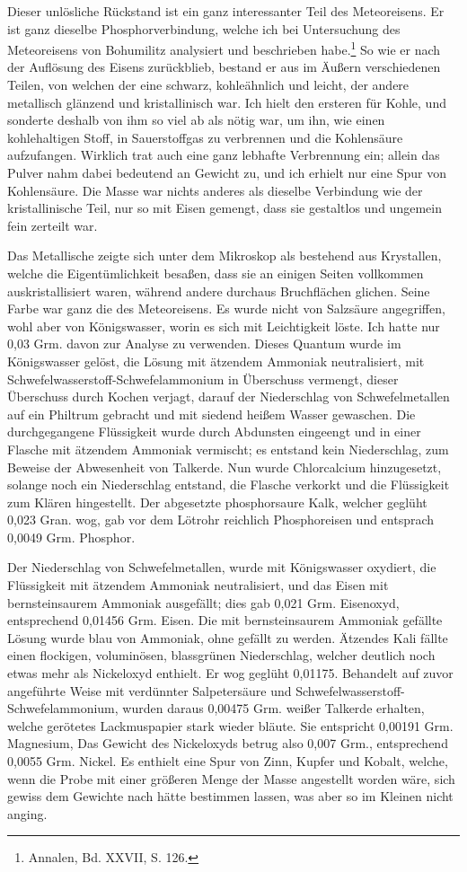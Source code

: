 \documentclass[a4paper, 11pt, oneside]{article}
\begin{document}
Dieser unlösliche Rückstand ist ein ganz interessanter Teil des Meteoreisens. Er ist ganz dieselbe Phosphorverbindung, welche ich bei Untersuchung des Meteoreisens von Bohumilitz analysiert und beschrieben habe.\footnote{Annalen, Bd. XXVII, S. 126.} So wie er nach der Auflösung des Eisens zurückblieb, bestand er aus im Äußern verschiedenen Teilen, von welchen der eine schwarz, kohleähnlich und leicht, der andere metallisch glänzend und kristallinisch war. Ich hielt den ersteren für Kohle, und sonderte deshalb von ihm so viel ab als nötig war, um ihn, wie einen kohlehaltigen Stoff, in Sauerstoffgas zu verbrennen und die Kohlensäure aufzufangen. Wirklich trat auch eine ganz lebhafte Verbrennung ein; allein das Pulver nahm dabei bedeutend an Gewicht zu, und ich erhielt nur eine Spur von Kohlensäure. Die Masse war nichts anderes als dieselbe Verbindung wie der kristallinische Teil, nur so mit Eisen gemengt, dass sie gestaltlos und ungemein fein zerteilt war.

Das Metallische zeigte sich unter dem Mikroskop als bestehend aus Krystallen, welche die Eigentümlichkeit besaßen, dass sie an einigen Seiten vollkommen auskristallisiert waren, während andere durchaus Bruchflächen glichen. Seine Farbe war ganz die des Meteoreisens. Es wurde nicht von Salzsäure angegriffen, wohl aber von Königswasser, worin es sich mit Leichtigkeit löste. Ich hatte nur 0,03 Grm. davon zur Analyse zu verwenden. Dieses Quantum wurde im Königswasser gelöst, die Lösung mit ätzendem Ammoniak neutralisiert, mit Schwefelwasserstoff-Schwefelammonium in Überschuss vermengt, dieser Überschuss durch Kochen verjagt, darauf der Niederschlag von Schwefelmetallen auf ein Philtrum gebracht und mit siedend heißem Wasser gewaschen. Die durchgegangene Flüssigkeit wurde durch Abdunsten eingeengt und in einer Flasche mit ätzendem Ammoniak vermischt; es entstand kein Niederschlag, zum Beweise der Abwesenheit von Talkerde. Nun wurde Chlorcalcium hinzugesetzt, solange noch ein Niederschlag entstand, die Flasche verkorkt und die Flüssigkeit zum Klären hingestellt. Der abgesetzte phosphorsaure Kalk, welcher geglüht 0,023 Gran. wog, gab vor dem Lötrohr reichlich Phosphoreisen und entsprach 0,0049 Grm. Phosphor.

Der Niederschlag von Schwefelmetallen, wurde mit Königswasser oxydiert, die Flüssigkeit mit ätzendem Ammoniak neutralisiert, und das Eisen mit bernsteinsaurem Ammoniak ausgefällt; dies gab 0,021 Grm. Eisenoxyd, entsprechend 0,01456 Grm. Eisen. Die mit bernsteinsaurem Ammoniak gefällte Lösung wurde blau von Ammoniak, ohne gefällt zu werden. Ätzendes Kali fällte einen flockigen, voluminösen, blassgrünen Niederschlag, welcher deutlich noch etwas mehr als Nickeloxyd enthielt. Er wog geglüht 0,01175. Behandelt auf zuvor angeführte Weise mit verdünnter Salpetersäure und Schwefelwasserstoff-Schwefelammonium, wurden daraus 0,00475 Grm. weißer Talkerde erhalten, welche gerötetes Lackmuspapier stark wieder bläute. Sie entspricht 0,00191 Grm. Magnesium, Das Gewicht des Nickeloxyds betrug also 0,007 Grm., entsprechend 0,0055 Grm. Nickel. Es enthielt eine Spur von Zinn, Kupfer und Kobalt, welche, wenn die Probe mit einer größeren Menge der Masse angestellt worden wäre, sich gewiss dem Gewichte nach hätte bestimmen lassen, was aber so im Kleinen nicht anging.
\end{document}

